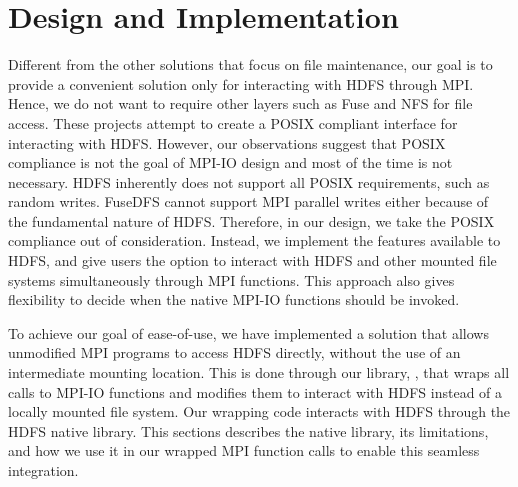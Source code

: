 

\section{Design and Implementation}
\label{sec:impl}
Different from the other solutions that focus on file maintenance, our goal is
to provide a convenient solution only for
interacting with HDFS through MPI. Hence, we do not want to require other layers such as
Fuse and NFS for file access. These projects attempt to create a POSIX compliant interface
for interacting with HDFS. However, our observations suggest that POSIX
compliance is not the goal of MPI-IO design and most of the time is not
necessary. HDFS inherently does not support all POSIX requirements, such as random writes. 
FuseDFS cannot support MPI parallel writes either because of the fundamental
nature of HDFS. Therefore, in our design, we take the POSIX compliance out of
consideration. Instead, we implement the features available to HDFS, and give
users the option to interact with HDFS and other mounted file systems simultaneously through
MPI functions. This approach
also gives {\proj} flexibility to decide when the native MPI-IO functions should
be invoked. 

To achieve our goal of ease-of-use, we have implemented a solution that allows unmodified
MPI programs to access HDFS directly, without the use of an intermediate mounting location. 
This is done through our library, {\proj}, that wraps all calls to MPI-IO
functions and modifies them to interact with HDFS instead of a locally mounted
file system. Our wrapping code interacts with HDFS through the HDFS native
library. This sections describes the native library, its limitations, and how we
use it in our wrapped MPI function calls to enable this seamless integration.

